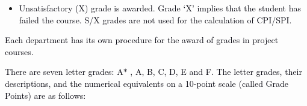 \documentclass[12pt]{article}
\begin{document}
\vspace{\baselineskip}
\begin{itemize}
	\item {\fontsize{10pt}{12.0pt}\selectfont \textcolor[HTML]{00000A}{Unsatisfactory (X) grade is awarded. Grade ‘X’ implies that the student has failed the course. S/X grades are not used for the calculation of CPI/SPI.}\par}
\end{itemize}\par


\vspace{\baselineskip}
{\fontsize{10pt}{12.0pt}\selectfont \textcolor[HTML]{00000A}{Each department has its own procedure for the award of grades in project courses.}\par}\par


\vspace{\baselineskip}
\begin{adjustwidth}{0.0in}{0.01in}
{\fontsize{10pt}{12.0pt}\selectfont \textcolor[HTML]{00000A}{There are seven letter grades: A$\ast$ , A, B, C, D, E and F. The letter grades, their descriptions, and the numerical equivalents on a 10-point scale (called Grade Points) are as follows:}\par}\par

\end{adjustwidth}


\vspace{\baselineskip}

\vspace{\baselineskip}


\end{document}
